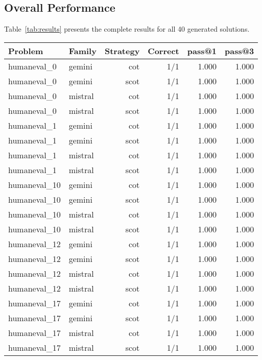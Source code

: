 \documentclass[11pt]{article}
\begin{document}
\subsection{Overall Performance}

Table~\ref{tab:results} presents the complete results for all 40 generated solutions.

\begin{table}[h]
\centering
\small
\begin{tabular}{llrrrr}
\toprule
\textbf{Problem} & \textbf{Family} & \textbf{Strategy} & \textbf{Correct} & \textbf{pass@1} & \textbf{pass@3} \\
\midrule
humaneval\_0 & gemini & cot & 1/1 & 1.000 & 1.000 \\
humaneval\_0 & gemini & scot & 1/1 & 1.000 & 1.000 \\
humaneval\_0 & mistral & cot & 1/1 & 1.000 & 1.000 \\
humaneval\_0 & mistral & scot & 1/1 & 1.000 & 1.000 \\
\midrule
humaneval\_1 & gemini & cot & 1/1 & 1.000 & 1.000 \\
humaneval\_1 & gemini & scot & 1/1 & 1.000 & 1.000 \\
humaneval\_1 & mistral & cot & 1/1 & 1.000 & 1.000 \\
humaneval\_1 & mistral & scot & 1/1 & 1.000 & 1.000 \\
\midrule
humaneval\_10 & gemini & cot & 1/1 & 1.000 & 1.000 \\
humaneval\_10 & gemini & scot & 1/1 & 1.000 & 1.000 \\
humaneval\_10 & mistral & cot & 1/1 & 1.000 & 1.000 \\
humaneval\_10 & mistral & scot & 1/1 & 1.000 & 1.000 \\
\midrule
humaneval\_12 & gemini & cot & 1/1 & 1.000 & 1.000 \\
humaneval\_12 & gemini & scot & 1/1 & 1.000 & 1.000 \\
humaneval\_12 & mistral & cot & 1/1 & 1.000 & 1.000 \\
humaneval\_12 & mistral & scot & 1/1 & 1.000 & 1.000 \\
\midrule
humaneval\_17 & gemini & cot & 1/1 & 1.000 & 1.000 \\
humaneval\_17 & gemini & scot & 1/1 & 1.000 & 1.000 \\
humaneval\_17 & mistral & cot & 1/1 & 1.000 & 1.000 \\
humaneval\_17 & mistral & scot & 1/1 & 1.000 & 1.000 \\
\midrule

\end{tabular}
\end{table}
\end{document}

